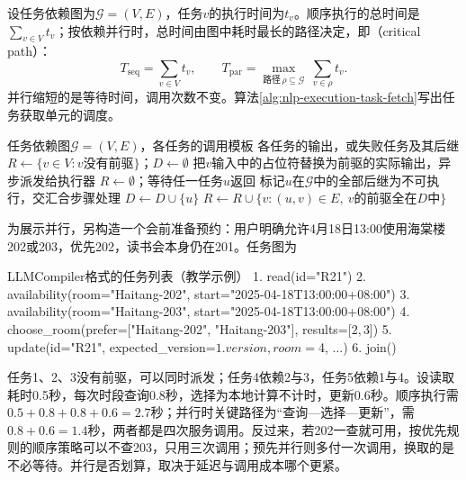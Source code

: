 设任务依赖图为$\mathcal{G}=(V,E)$，任务$v$的执行时间为$t_v$。顺序执行的总时间是$\sum_{v\in V}t_v$；按依赖并行时，总时间由图中耗时最长的路径决定，即（critical path）：
\begin{equation}
 T_{\mathrm{seq}}=\sum_{v\in V}t_v,\qquad
 T_{\mathrm{par}}=\max_{\text{路径}\,\rho\subseteq\mathcal{G}}\ \sum_{v\in\rho}t_v .
 \label{eq:nlp-execution-critical-path}
\end{equation}
并行缩短的是等待时间，调用次数不变。算法\ref{alg:nlp-execution-task-fetch}写出任务获取单元的调度。

\begin{algorithm}[任务获取单元的依赖调度]
\label{alg:nlp-execution-task-fetch}
\begin{algorithmic}[1]
\Require 任务依赖图$\mathcal{G}=(V,E)$，各任务的调用模板
\Ensure 各任务的输出，或失败任务及其后继
\State $R\gets\{v\in V:v\text{没有前驱}\}$；$D\gets\emptyset$
    \State 把$v$输入中的占位符替换为前驱的实际输出，异步派发给执行器
  \EndFor
  \State $R\gets\emptyset$；等待任一任务$u$返回
    \State 标记$u$在$\mathcal{G}$中的全部后继为不可执行，交汇合步骤处理
  \Else
    \State $D\gets D\cup\{u\}$
    \State $R\gets R\cup\{v:(u,v)\in E,\ v\text{的前驱全在}D\text{中}\}$
  \EndIf
\EndWhile
\end{algorithmic}
\end{algorithm}

为展示并行，另构造一个会前准备预约：用户明确允许4月18日13:00使用海棠楼202或203，优先202，读书会本身仍在201。任务图为

\begin{codeblock}[label={code:nlp-execution-compiler-plan}]{LLMCompiler格式的任务列表（教学示例）}
1. read(id="R21")
2. availability(room="Haitang-202", start="2025-04-18T13:00:00+08:00")
3. availability(room="Haitang-203", start="2025-04-18T13:00:00+08:00")
4. choose_room(prefer=["Haitang-202", "Haitang-203"], results=[$2, $3])
5. update(id="R21", expected_version=$1.version, room=$4, ...)
6. join()
\end{codeblock}

任务1、2、3没有前驱，可以同时派发；任务4依赖2与3，任务5依赖1与4。设读取耗时0.5秒，每次时段查询0.8秒，选择为本地计算不计时，更新0.6秒。顺序执行需$0.5+0.8+0.8+0.6=2.7$秒；并行时关键路径为“查询—选择—更新”，需$0.8+0.6=1.4$秒，两者都是四次服务调用。反过来，若202一查就可用，按优先规则的顺序策略可以不查203，只用三次调用；预先并行则多付一次调用，换取的是不必等待。并行是否划算，取决于延迟与调用成本哪个更紧。

